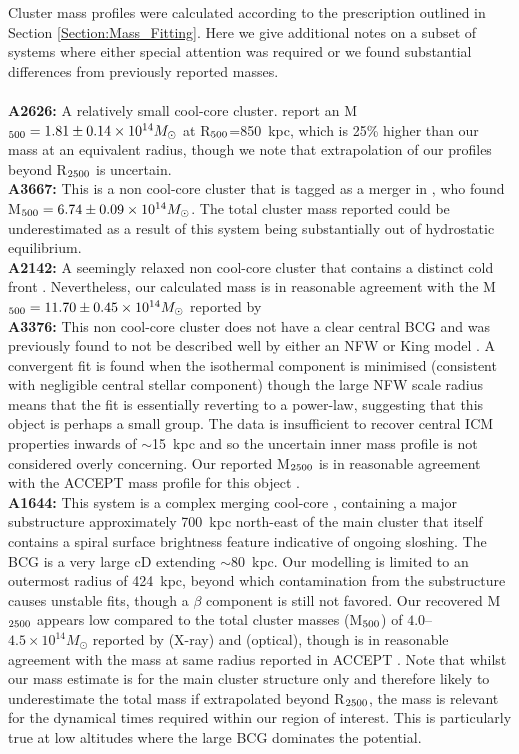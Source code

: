\documentclass[twocolumn]{aastex6}
\begin{document}
Cluster mass profiles were calculated according to the prescription outlined in Section \ref{Section:Mass_Fitting}.  Here we give additional notes on a subset of systems where either special attention was required or we found substantial differences from previously reported masses. \\
 \\
{\bf A2626:} A relatively small cool-core cluster.  \citet[][]{Zhao13} report an M$_{\rm 500} = 1.81 \pm 0.14\times10^{14}M_{\odot}$ at R$_{\rm 500}$=850~kpc, which is 25\% higher than our mass at an equivalent radius, though we note that extrapolation of our profiles beyond R$_{\rm 2500}$ is uncertain. \\
{\bf A3667:}  This is a non cool-core cluster that is tagged as a merger in \citet[][]{Vikhlinin09}, who found M$_{\rm 500} = 6.74 \pm 0.09\times10^{14}M_{\odot}$.  The total cluster mass reported could be underestimated as a result of this system being substantially out of hydrostatic equilibrium. \\
{\bf A2142:}  A seemingly relaxed non cool-core cluster that contains a distinct cold front \cite[][]{Owers11}.  Nevertheless, our calculated mass is in reasonable agreement with the M$_{\rm 500} = 11.70 \pm 0.45\times10^{14}M_{\odot}$ reported by \citet[][]{Vikhlinin09} \\
{\bf A3376:} This non cool-core cluster does not have a clear central BCG and was previously found to not be described well by either an NFW or King model \cite[][]{Ettori02}.  A convergent fit is found when the isothermal component is minimised (consistent with negligible central stellar component) though the large NFW scale radius means that the fit is essentially reverting to a power-law, suggesting that this object is perhaps a small group.  The data is insufficient to recover central ICM properties inwards of $\sim$15~kpc and so the uncertain inner mass profile is not considered overly concerning.  Our reported M$_{\rm 2500}$ is in reasonable agreement with the ACCEPT mass profile for this object \cite[][]{Cavagnolo09}. \\
{\bf A1644:} This system is a complex merging cool-core \cite[][]{Reiprich04}, containing a major substructure approximately 700~kpc north-east of the main cluster that itself contains a spiral surface brightness feature indicative of ongoing sloshing.  The BCG is a very large cD extending $\sim$80~kpc.  Our modelling is limited to an outermost radius of 424~kpc, beyond which contamination from the substructure causes unstable fits, though a $\beta$ component is still not favored.  Our recovered M$_{\rm 2500}$ appears low compared to the total cluster masses (M$_{\rm 500}$) of $4.0$--$4.5\times10^{14}M_{\odot}$ reported by \citet[][]{Vikhlinin09} (X-ray) and \citet[][]{Girardi98} (optical), though is in reasonable agreement with the mass at same radius reported in ACCEPT \cite[][]{Cavagnolo09}.   Note that whilst our mass estimate is for the main cluster structure only and therefore likely to underestimate the total mass if extrapolated beyond R$_{\rm 2500}$, the mass is relevant for the dynamical times required within our region of interest.  This is particularly true at low altitudes where the large BCG dominates the potential. \\
\end{document}
